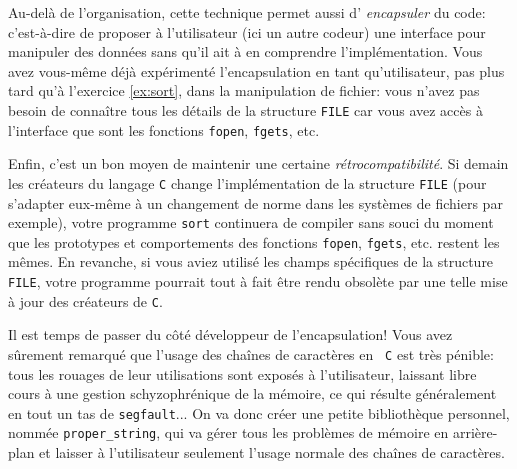 \documentclass[french,a4paper]{article}
\theoremstyle{definition}
\theoremstyle{remark}
\newcommand{\shell}[1]{\lstinline[style={},style=sh]|#1|}
\newcommand{\inlinec}[1]{\lstinline[style=C]°#1°}
\begin{document}
Au-delà de l'organisation, cette technique permet aussi d'{\em
  encapsuler} du code: c'est-à-dire de proposer à l'utilisateur (ici
un autre codeur) une interface pour manipuler des données sans qu'il
ait à en comprendre l'implémentation. Vous avez vous-même déjà
expérimenté l'encapsulation en tant qu'utilisateur, pas plus tard qu'à
l'exercice \ref{ex:sort}, dans la manipulation de fichier: vous n'avez
pas besoin de connaître tous les détails de la structure
\inlinec{FILE} car vous avez accès à l'interface que sont les
fonctions \inlinec{fopen}, \inlinec{fgets}, etc.

Enfin, c'est un bon moyen de maintenir une certaine {\em
  rétrocompatibilité}. Si demain les créateurs du langage {\tt C}
change l'implémentation de la structure \inlinec{FILE} (pour s'adapter
eux-même à un changement de norme dans les systèmes de fichiers par
exemple), votre programme \shell{sort} continuera de compiler sans
souci du moment que les prototypes et comportements des fonctions
\inlinec{fopen}, \inlinec{fgets}, etc. restent les mêmes. En revanche,
si vous aviez utilisé les champs spécifiques de la structure
\inlinec{FILE}, votre programme pourrait tout à fait être rendu
obsolète par une telle mise à jour des créateurs de {\tt C}.

\medskip

Il est temps de passer du côté développeur de l'encapsulation! Vous
avez sûrement remarqué que l'usage des chaînes de caractères en {\tt
  C} est très pénible: tous les rouages de leur utilisations sont
exposés à l'utilisateur, laissant libre cours à une gestion
schyzophrénique de la mémoire, ce qui résulte généralement en tout un
tas de \shell{segfault}... On va donc créer une petite bibliothèque
personnel, nommée \shell{proper_string}, qui va gérer tous les
problèmes de mémoire en arrière-plan et laisser à l'utilisateur
seulement l'usage normale des chaînes de caractères.
\end{document}
